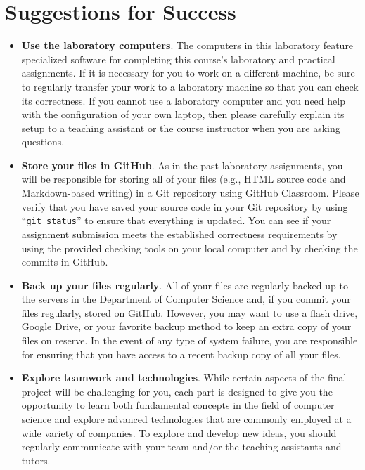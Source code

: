 \documentclass[11pt]{article}
\newcommand{\command}[1]{``\lstinline{#1}''}
\begin{document}
\section*{Suggestions for Success}

\begin{itemize}
  \setlength{\itemsep}{0pt}

\item {\bf Use the laboratory computers}. The computers in this laboratory
  feature specialized software for completing this course's laboratory and
  practical assignments. If it is necessary for you to work on a different
  machine, be sure to regularly transfer your work to a laboratory machine so
  that you can check its correctness. If you cannot use a laboratory computer
  and you need help with the configuration of your own laptop, then please
  carefully explain its setup to a teaching assistant or the course instructor
  when you are asking questions.

\item {\bf Store your files in GitHub}. As in the past laboratory assignments,
  you will be responsible for storing all of your files (e.g., HTML source code
  and Markdown-based writing) in a Git repository using GitHub Classroom. Please
  verify that you have saved your source code in your Git repository by using
  \command{git status} to ensure that everything is updated. You can see if your
  assignment submission meets the established correctness requirements by using
  the provided checking tools on your local computer and by checking the commits
  in GitHub.

\item {\bf Back up your files regularly}. All of your files are regularly
  backed-up to the servers in the Department of Computer Science and, if you
  commit your files regularly, stored on GitHub. However, you may want to use a
  flash drive, Google Drive, or your favorite backup method to keep an extra
  copy of your files on reserve. In the event of any type of system failure, you
  are responsible for ensuring that you have access to a recent backup copy of
  all your files.

\item {\bf Explore teamwork and technologies}. While certain aspects of the
  final project will be challenging for you, each part is designed to give you
  the opportunity to learn both fundamental concepts in the field of computer
  science and explore advanced technologies that are commonly employed at a wide
  variety of companies. To explore and develop new ideas, you should regularly
  communicate with your team and/or the teaching assistants and tutors.


\end{itemize}
\end{document}
